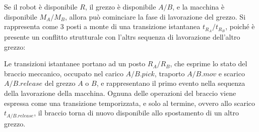 \documentclass{article}
\numberwithin{equation}{subsection}
\begin{document}
Se il robot è disponibile $R$, il grezzo è disponibile $A/B$, e la macchina è disponibile $M_A/M_B$, allora può cominciare la fase di lavorazione del grezzo. Si rappresenta 
come $3$ posti a monte di una transizione istantanea $t_{R_A}/t_{R_B}$, poiché è presente un conflitto strutturale con l'altrs sequenza di lavorazione dell'altro grezzo:
\begin{center}
\end{center}
Le transizioni istantanee portano ad un posto $R_A/R_B$, che esprime lo stato del braccio meccanico, occupato nel carico $A/B.pick$, traporto $A/B.mov$ e scarico $A/B.release$ 
del grezzo $A$ o $B$, e rappresentano il primo evento nella sequenza della lavorazione della macchina. Ognuna delle operazioni del braccio viene espressa come una transizione 
temporizzata, e solo al termine, ovvero allo scarico $t_{A/B.release}$, il braccio torna di nuovo disponibile allo spostamento di un altro grezzo. 
\end{document}
